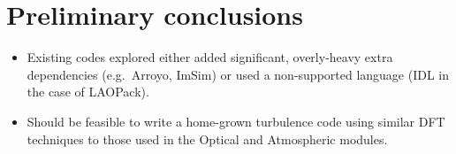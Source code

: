 \documentclass[preprint]{aastex}
\newcommand{\arroyo}{{\sc Arroyo}}
\newcommand{\laopack}{{\sc LAOPack}}
\newcommand{\imsim}{{\sc ImSim}}
\begin{document}
\section{Preliminary conclusions}

\begin{itemize}
\item Existing codes explored either added significant, overly-heavy
  extra dependencies (e.g.\ \arroyo, \imsim) or used a non-supported language
  (IDL in the case of \laopack).
\item Should be feasible to write a home-grown turbulence code using
  similar DFT techniques to those used in the Optical and Atmospheric modules.
\end{itemize}
\end{document}
